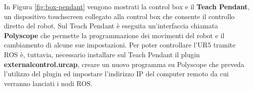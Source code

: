 In Figura \ref{fig:box-pendant} vengono mostrati la control box e il \textbf{Teach Pendant}, un dispositivo touchscreen collegato 
alla control box che consente il controllo diretto del robot. Sul Teach Pendant \`{e} eseguita un'interfaccia chiamata \textbf{Polyscope} 
che permette la programmazione dei movimenti del robot e il cambiamento di alcune sue impostazioni. 
Per poter controllare l'UR5 tramite ROS \`{e}, tuttavia, necessario installare sul Teach Pendant il plugin \textbf{externalcontrol.urcap}, 
creare un nuovo programma su Polyscope che preveda l'utilizzo del plugin ed impostare l'indirizzo IP del computer remoto da cui 
verranno lanciati i nodi ROS.
